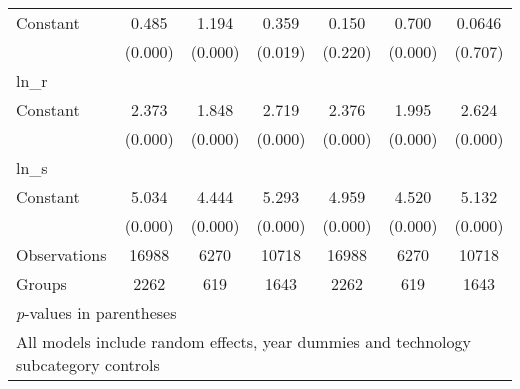\begin{sidewaystable}[htbp]
\begin{tabular}{l*{6}{c}}
Constant        &    0.485&    1.194&    0.359&    0.150&    0.700&   0.0646\\
                &  (0.000)&  (0.000)&  (0.019)&  (0.220)&  (0.000)&  (0.707)\\
\hline
ln\_r            &         &         &         &         &         &         \\
Constant        &    2.373&    1.848&    2.719&    2.376&    1.995&    2.624\\
                &  (0.000)&  (0.000)&  (0.000)&  (0.000)&  (0.000)&  (0.000)\\
\hline
ln\_s            &         &         &         &         &         &         \\
Constant        &    5.034&    4.444&    5.293&    4.959&    4.520&    5.132\\
                &  (0.000)&  (0.000)&  (0.000)&  (0.000)&  (0.000)&  (0.000)\\
\hline
Observations    &    16988&     6270&    10718&    16988&     6270&    10718\\
Groups          &     2262&      619&     1643&     2262&      619&     1643\\
\hline\hline
\multicolumn{7}{l}{\footnotesize \textit{p}-values in parentheses}\\
\multicolumn{7}{l}{\footnotesize All models include random effects, year dummies and technology subcategory controls}\\
\end{tabular}
\end{sidewaystable}
